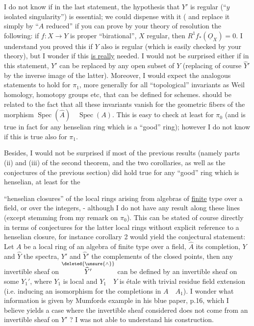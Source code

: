 I do not know if in the last statement, the hypothesis that $Y'$ is regular (``$y$ isolated singularity'') is essential; we could dispense with it ( and replace it simply by ``$A$ reduced'' if you can prove by your theory of resolution the following: if $f:X\rightarrow Y$ is proper ``birational'', $X$ regular, then $R^1f_*(\underline{O}_X)=0$. I understand you proved this if $Y$ also is regular (which is easily checked by your theory), but I wonder if this \uline{is really} needed. I would not be surprised either if in this statement, $Y'$ can be replaced by any open subset of $Y$ (replacing of course $\widehat{Y}'$ by the inverse image of the latter). Moreover, I would expect the analogous statements to hold for $\pi_1$, more generally for all ``topological'' invariants as Weil homology, homotopy groups etc, that can be defined for schemes.  should be related to the fact that all these invariants vanish for the geometric fibers of the morphism $\operatorname{Spec}(\widehat{A})\quad\operatorname{Spec}(A)$. This is easy to check at least for $\pi_0$ (and is true in fact for any henselian ring which is a ``good'' ring); however I do not know if this is true also for $\pi_1$.

Besides, I would not be surprised if most of the previous results (namely parts (ii) and (iii) of the second theorem, and the two corollaries, as well as the  conjectures of the previous section) did hold true for any ``good'' ring which is henselian,  at least for the



``henselian closures'' of the local rings arising from algebras of \uline{finite} type over a field, or over the integers, - although I do not have any result along these lines (except  stemming from my remark on $\pi_0$).  This can be stated of course directly in terms of conjectures for the latter local rings without explicit reference to a henselian closure, for instance corollary 2 would yield the conjectural statement: Let $A$ be a local  ring of an algebra of finite type over a field, $\widehat{A}$ its completion, $Y$ and $\widehat{Y}$ the spectra, $Y'$ and $\widehat{Y}'$ the complements of the closed points,  then any invertible sheaf on $\overset{\deleted{\unsure{\wedge}}}{\widehat{Y}'}$ can be defined by an invertible sheaf on some $Y_1'$, where $Y_1$ is local and $Y_1\quad Y$ is étale with trivial residue field extension (i.e. inducing an isomorphism for the completions in $A\quad A_1$). I wonder what information is given by Mumfords example in his blue paper, p.16, which I believe yields a case where the invertible sheaf considered does not come from an invertible sheaf on $Y'$ ? I  was not able to understand his construction.


